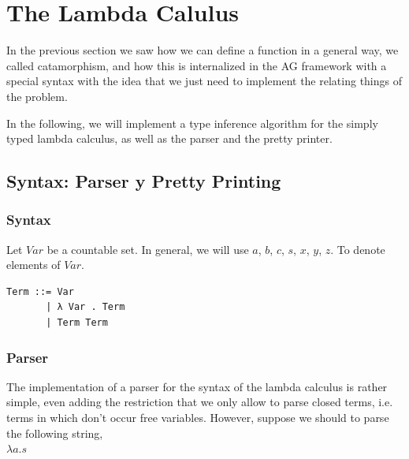 \documentclass[a4paper,10pt]{article}
\begin{document}

\section{The Lambda Calulus}

In the previous section we saw how we can define a function in a general way, we called
catamorphism, and how this is internalized in the AG framework with a special syntax
with the idea that we just need to implement the relating things of the problem.

In the following, we will implement a type inference algorithm for the simply typed lambda
calculus, as well as the parser and the pretty printer.

\subsection{Syntax: Parser y Pretty Printing}

\subsubsection{Syntax}

Let $Var$ be a countable set. In general, we will use $a$, $b$, $c$, $s$, $x$, $y$, $z$. To
denote elements of $Var$.

\begin{lstlisting}
Term ::= Var
       | λ Var . Term
       | Term Term
\end{lstlisting}

\subsubsection{Parser}

The implementation of a parser for the syntax of the lambda calculus is rather simple,
even adding the restriction that we only allow to parse closed terms, i.e. terms in which
don't occur free variables. However, suppose we should to parse the following string,\\

$\lambda a . s$\\
\end{document}
